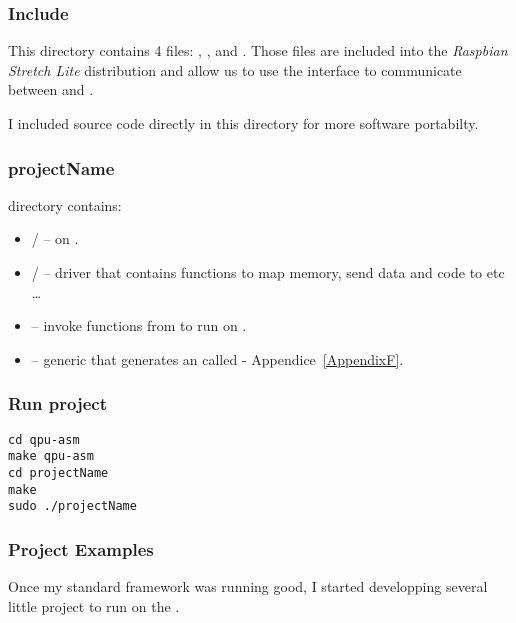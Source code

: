 \subsubsection{Include}

This directory contains 4 files: , ,  and .
Those files are included into the \emph{Raspbian Stretch Lite} distribution and allow us to use the \mail{} interface to communicate between \vc{} and \cpu.

I included \mail{} source code directly in this directory for more software portabilty.

\subsubsection{projectName}

 directory contains:
\begin{itemize}
	\item {}/ --  on \vc.
	\item {}/ --  driver that contains functions to map memory, send data and code to \vc{} etc \ldots
	\item {} -- invoke functions from  to run  on \vc.
	\item {} -- generic  that generates an  called  - Appendice~\ref{AppendixF}.
\end{itemize}


\subsubsection{Run project}
\begin{lstlisting}
cd qpu-asm
make qpu-asm
cd projectName
make
sudo ./projectName
\end{lstlisting}


\subsubsection{Project Examples}

Once my standard framework was running good, I started developping several little project to run on the \rasp.


